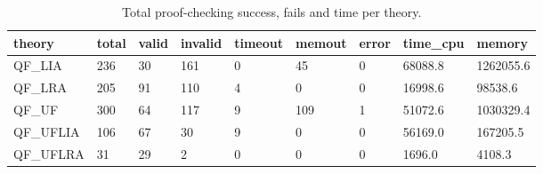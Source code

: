\begin{table}[t]
\centering
\begin{tabular}{ l l l l l l l l l }
\toprule
theory & total & valid & invalid & timeout & memout & error  & time\_cpu &  memory \\ \midrule
QF\_LIA & 236 & 30 & 161 & 0 & 45 & 0 & 68088.8 & 1262055.6 \\ \midrule
QF\_LRA & 205 & 91 & 110 & 4 & 0 & 0 & 16998.6 & 98538.6 \\ \midrule
QF\_UF & 300 & 64 & 117 & 9 & 109 & 1 & 51072.6 & 1030329.4 \\ \midrule
QF\_UFLIA & 106 & 67 & 30 & 9 & 0 & 0 & 56169.0 & 167205.5 \\ \midrule
QF\_UFLRA & 31 & 29 & 2 & 0 & 0 & 0 & 1696.0 & 4108.3 \\ \bottomrule
\end{tabular}
\caption{Total proof-checking success, fails and time per theory.}\label{bench}
\end{table}

 \\

